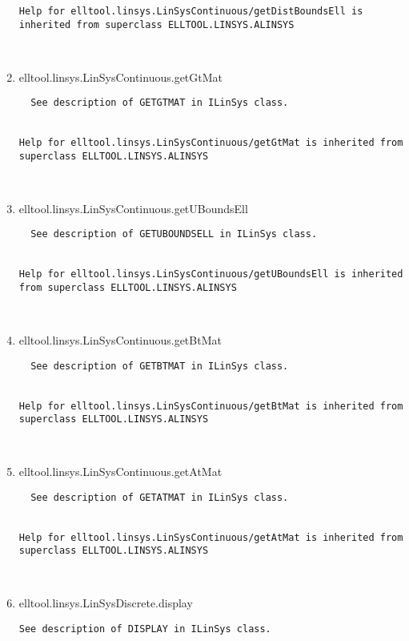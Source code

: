 \begin{enumerate}
\begin{lstlisting}
Help for elltool.linsys.LinSysContinuous/getDistBoundsEll is inherited from superclass ELLTOOL.LINSYS.ALINSYS



\end{lstlisting}
\fontfamily{\familydefault}
\selectfont
\item {elltool.linsys.LinSysContinuous.getGtMat}
\selectfont
\begin{lstlisting}
  See description of GETGTMAT in ILinSys class.


Help for elltool.linsys.LinSysContinuous/getGtMat is inherited from superclass ELLTOOL.LINSYS.ALINSYS



\end{lstlisting}
\fontfamily{\familydefault}
\selectfont
\item {elltool.linsys.LinSysContinuous.getUBoundsEll}
\selectfont
\begin{lstlisting}
  See description of GETUBOUNDSELL in ILinSys class.


Help for elltool.linsys.LinSysContinuous/getUBoundsEll is inherited from superclass ELLTOOL.LINSYS.ALINSYS



\end{lstlisting}
\fontfamily{\familydefault}
\selectfont
\item {elltool.linsys.LinSysContinuous.getBtMat}
\selectfont
\begin{lstlisting}
  See description of GETBTMAT in ILinSys class.


Help for elltool.linsys.LinSysContinuous/getBtMat is inherited from superclass ELLTOOL.LINSYS.ALINSYS



\end{lstlisting}
\fontfamily{\familydefault}
\selectfont
\item {elltool.linsys.LinSysContinuous.getAtMat}
\selectfont
\begin{lstlisting}
  See description of GETATMAT in ILinSys class.


Help for elltool.linsys.LinSysContinuous/getAtMat is inherited from superclass ELLTOOL.LINSYS.ALINSYS



\end{lstlisting}
\fontfamily{\familydefault}
\selectfont
\item {elltool.linsys.LinSysDiscrete.display}
\selectfont
\begin{lstlisting}
See description of DISPLAY in ILinSys class.





\end{lstlisting}
\end{enumerate}
